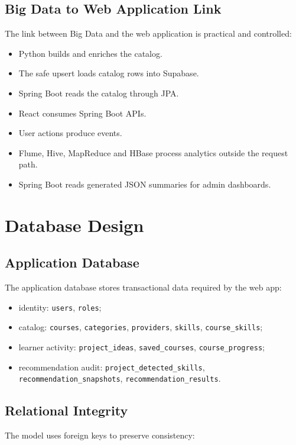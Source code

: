 \documentclass[12pt,a4paper]{report}
\begin{document}
\section{Big Data to Web Application Link}
The link between Big Data and the web application is practical and controlled:

\begin{itemize}[leftmargin=*]
    \item Python builds and enriches the catalog.
    \item The safe upsert loads catalog rows into Supabase.
    \item Spring Boot reads the catalog through JPA.
    \item React consumes Spring Boot APIs.
    \item User actions produce events.
    \item Flume, Hive, MapReduce and HBase process analytics outside the request path.
    \item Spring Boot reads generated JSON summaries for admin dashboards.
\end{itemize}

\chapter{Database Design}

\section{Application Database}
The application database stores transactional data required by the web app:

\begin{itemize}[leftmargin=*]
    \item identity: \texttt{users}, \texttt{roles};
    \item catalog: \texttt{courses}, \texttt{categories}, \texttt{providers}, \texttt{skills}, \texttt{course\_skills};
    \item learner activity: \texttt{project\_ideas}, \texttt{saved\_courses}, \texttt{course\_progress};
    \item recommendation audit: \texttt{project\_detected\_skills}, \texttt{recommendation\_snapshots}, \texttt{recommendation\_results}.
\end{itemize}

\section{Relational Integrity}
The model uses foreign keys to preserve consistency:
\end{document}
